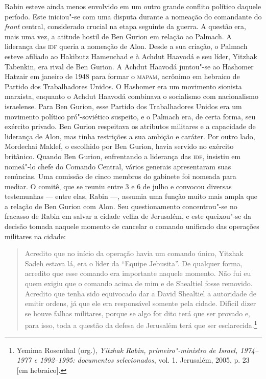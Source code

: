 Rabin esteve ainda menos envolvido em um outro grande conflito político daquele
período. Este iniciou"-se com uma disputa durante a nomeação do
comandante do \emph{front} central, considerado crucial na etapa seguinte da
guerra. A questão era, mais uma vez, a atitude hostil de Ben Gurion em
relação ao Palmach. A liderança das \textsc{idf} queria a nomeação de Alon. Desde
a sua criação, o Palmach esteve afiliado ao Hakibutz Hameuchad e à Achdut
Haavodá e seu líder, Yitzhak Tabenkin, era rival de Ben Gurion. A Achdut
Haavodá juntou"-se ao Hashomer Hatzair em janeiro de 1948 para formar o
\textsc{mapam}, acrônimo em hebraico de Partido dos Trabalhadores Unidos. O
Hashomer era um movimento sionista marxista, enquanto o Achdut Haavodá
combinava o socialismo com nacionalismo israelense. Para Ben Gurion, esse
Partido dos Trabalhadores Unidos era um movimento político
pró"-soviético suspeito, e o Palmach era, de certa forma, seu exército
privado. Ben Gurion respeitava os atributos militares e a capacidade de
liderança de Alon, mas tinha restrições a sua ambição e caráter. Por outro lado,
Mordechai Maklef, o escolhido por Ben Gurion, havia servido
no exército britânico. Quando Ben Gurion, enfrentando a liderança das
\textsc{idf}, insistiu em nomeá"-lo chefe do Comando Central, vários generais
apresentaram suas renúncias. Uma comissão de cinco membros do gabinete
foi nomeada para mediar. O comitê, que se reuniu entre 3 e 6 de julho e
convocou diversas testemunhas --- entre elas, Rabin ---, assumia uma função
muito mais ampla que a relação de Ben Gurion com Alon. Seu
questionamento concentrou"-se no fracasso de Rabin em salvar a cidade
velha de Jerusalém, e este queixou"-se da decisão tomada naquele momento
de cancelar o comando unificado das operações militares na cidade:

\begin{quote}
Acredito que no início da operação havia um comando único, Yitzhak
Sadeh estava lá, era o líder da ``Equipe Jebusita''. De qualquer forma,
acredito que esse comando era importante naquele momento. Não fui eu
quem exigiu que o comando acima de mim e de Shealtiel fosse removido.
Acredito que tenha sido equivocado dar a David Shealtiel a autoridade de
emitir ordens, já que ele era responsável somente pela cidade. Difícil
dizer se houve falhas militares, porque se algo for dito terá que ser
provado e, para isso, toda a questão da defesa de Jerusalém terá que ser
esclarecida.\footnote{Yemima Rosenthal (org.), \emph{Yitzhak Rabin, primeiro"-ministro de
Israel, 1974--1977 e 1992--1995: documentos selecionados}, vol. 1. Jerusalém,
2005, p. 23 {[}em hebraico{]}.}
\end{quote}

